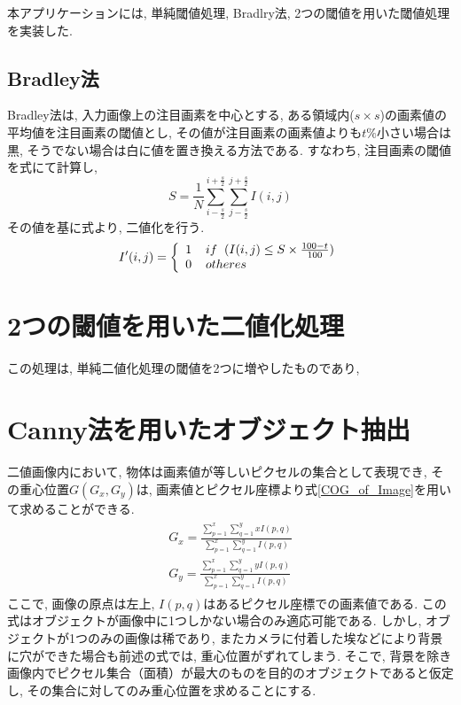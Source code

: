 \documentclass{suribt}
\begin{document}
本アプリケーションには, 単純閾値処理, Bradlry法, 2つの閾値を用いた閾値処理を実装した. 
\subsection{Bradley法}
Bradley法は, 入力画像上の注目画素を中心とする, ある領域内($s \times s$)の画素値の平均値を注目画素の閾値とし, その値が注目画素の画素値よりも$t\%$小さい場合は黒, そうでない場合は白に値を置き換える方法である. すなわち, 注目画素の閾値を式\cite{Center_Thresh}にて計算し,
\begin{equation}
	\label{Center_Thresh}
	S = \frac{1}{N} \sum_{i-\frac{s}{2}}^{i+\frac{s}{2}} \sum_{j-\frac{s}{2}}^{j+\frac{s}{2}} I(i, j)
\end{equation}
その値を基に式\cite{Bradley_Thresh}より, 二値化を行う.
\begin{equation}
	\label{Bradley_Thresh}
	I'(i, j) = \left\{
		\begin{array}{l}
			1 \hspace{4mm} if \hspace{2mm} (I(i, j) \leq S \times \frac{100 - t}{100})\\
			0 \hspace{4mm} otheres
		\end{array}
		\right.
\end{equation}

\section{2つの閾値を用いた二値化処理}
この処理は, 単純二値化処理の閾値を2つに増やしたものであり, 

\section{Canny法を用いたオブジェクト抽出}
二値画像内において, 物体は画素値が等しいピクセルの集合として表現でき, その重心位置$G(G_x, G_y)$は, 画素値とピクセル座標より式\ref{COG_of_Image}を用いて求めることができる.
\begin{align}
	\begin{aligned}
		\label{COG_of_Image}
		G_x = \frac{\sum_{p=1}^x \sum_{q=1}^y xI(p, q)}{\sum_{p=1}^x \sum_{q=1}^y I(p, q)}\\
		G_y = \frac{\sum_{p=1}^x \sum_{q=1}^y yI(p, q)}{\sum_{p=1}^x \sum_{q=1}^y I(p, q)}
	\end{aligned}
\end{align}
ここで, 画像の原点は左上, $I(p, q)$はあるピクセル座標での画素値である. 
この式はオブジェクトが画像中に1つしかない場合のみ適応可能である. しかし, オブジェクトが1つのみの画像は稀であり, またカメラに付着した埃などにより背景に穴ができた場合も前述の式では, 重心位置がずれてしまう.
そこで, 背景を除き画像内でピクセル集合（面積）が最大のものを目的のオブジェクトであると仮定し, その集合に対してのみ重心位置を求めることにする. 
\end{document}
